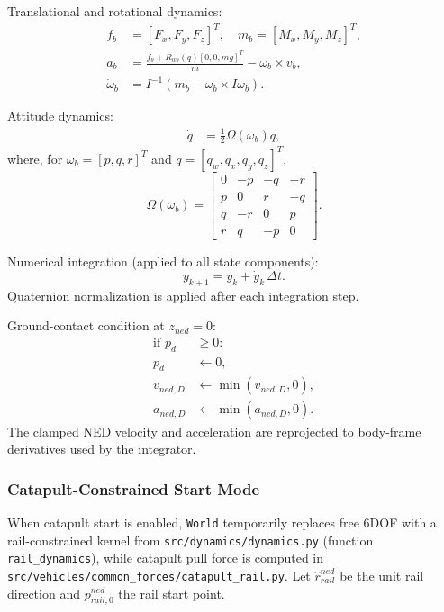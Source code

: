 \documentclass[11pt,a4paper]{article}
\begin{document}
Translational and rotational dynamics:
\begin{align}
f_b &= [F_x,F_y,F_z]^T, \quad m_b=[M_x,M_y,M_z]^T, \\
a_b &= \frac{f_b + R_{wb}(q)[0,0,mg]^T}{m} - \omega_b \times v_b, \\
\dot{\omega}_b &= I^{-1}\left(m_b - \omega_b \times I\omega_b\right).
\end{align}

Attitude dynamics:
\begin{align}
\dot{q} &= \frac{1}{2}\Omega(\omega_b)q,
\end{align}
where, for $\omega_b=[p,q,r]^T$ and $q=[q_w,q_x,q_y,q_z]^T$,
\begin{equation}
\Omega(\omega_b)=
\begin{bmatrix}
0 & -p & -q & -r \\
p & 0 & r & -q \\
q & -r & 0 & p \\
r & q & -p & 0
\end{bmatrix}.
\end{equation}

Numerical integration (applied to all state components):
\begin{equation}
y_{k+1} = y_k + \dot{y}_k\,\Delta t.
\end{equation}
Quaternion normalization is applied after each integration step.

Ground-contact condition at $z_{ned}=0$:
\begin{align}
\text{if } p_d &\ge 0: \\
p_d &\leftarrow 0, \\
v_{ned,D} &\leftarrow \min(v_{ned,D},0), \\
a_{ned,D} &\leftarrow \min(a_{ned,D},0).
\end{align}
The clamped NED velocity and acceleration are reprojected to body-frame derivatives used by the integrator.

\subsubsection{Catapult-Constrained Start Mode}
When catapult start is enabled, \texttt{World} temporarily replaces free 6DOF with a rail-constrained kernel from \texttt{src/dynamics/dynamics.py} (function \texttt{rail\_dynamics}), while catapult pull force is computed in \texttt{src/vehicles/common\_forces/catapult\_rail.py}. Let $\hat r_{rail}^{ned}$ be the unit rail direction and $p_{rail,0}^{ned}$ the rail start point.
\end{document}
